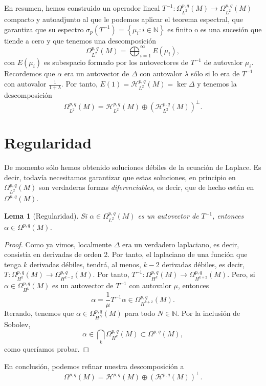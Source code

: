\documentclass[12pt,a4paper]{article}
\newtheorem{lema}[thm]{Lema}
\theoremstyle{definition} \newtheorem{defn}[thm]{Definición}
\theoremstyle{definition} \newtheorem{ejemplo}[thm]{Ejemplo}
\theoremstyle{definition} \newtheorem{ejercicio}[thm]{Ejercicio}
\theoremstyle{remark} \newtheorem*{obs}{Observación}
\newcommand{\NN}{\mathbb{N}}
\begin{document}
    En resumen, hemos construido un operador lineal $T^{-1}:\Omega^{p,q}_{L^2}(M)\rightarrow \Omega^{p,q}_{L^2}(M)$ compacto y autoadjunto al que le podemos aplicar el teorema espectral, que garantiza que su espectro $\sigma_p(T^{-1})=\left\{ \mu_i:i\in \NN \right\}$ es finito o es una sucesión que tiende a cero y que tenemos una descomposición
    \begin{equation*}
      \Omega^{p,q}_{L^2}(M)=\bigoplus_{i=1}^{\infty} E(\mu_i),
    \end{equation*}
    con $E(\mu_i)$ es subespacio formado por los autovectores de $T^{-1}$ de autovalor $\mu_i$. Recordemos que $\alpha$ era un autovector de $\Delta$ con autovalor $\lambda$ sólo si lo era de $T^{-1}$ con autovalor $\frac{1}{1+\lambda}$. Por tanto, $E(1)=\mathcal{H}^{p,q}_{L^2}(M)=\ker \Delta$ y tenemos la descomposición
    \begin{equation*}
      \Omega^{p,q}_{L^2}(M)=\mathcal{H}^{p,q}_{L^2}(M)\oplus(\mathcal{H}^{p,q}_{L^2}(M))^{\perp}.
    \end{equation*}

    \section{Regularidad}
    De momento sólo hemos obtenido soluciones débiles de la ecuación de Laplace. Es decir, todavía necesitamos garantizar que estas soluciones, en principio en $\Omega^{p,q}_{L^2}(M)$ son verdaderas formas \emph{diferenciables}, es decir, que de hecho están en $\Omega^{p,q}(M)$.

    \begin{lema}[Regularidad]
      Si $\alpha \in \Omega^{p,q}_{L^2}(M)$ es un autovector de $T^{-1}$, entonces $\alpha \in \Omega^{p,q}(M)$.
    \end{lema}
    \begin{proof}
      Como ya vimos, localmente $\Delta$ era un verdadero laplaciano, es decir, consistía en derivadas de orden 2. Por tanto, el laplaciano de una función que tenga $k$ derivadas débiles, tendrá, al menos, $k-2$ derivadas débiles, es decir, $T:\Omega^{p,q}_{H^k}(M) \rightarrow \Omega^{p,q}_{H^{k-2}}(M)$. Por tanto, $T^{-1}:\Omega^{p,q}_{H^{k}}(M) \rightarrow \Omega^{p,q}_{H^{k+2}}(M)$.     Pero, si $\alpha\in \Omega^{p,q}_{H^k}(M)$ es un autovector de $T^{-1}$ con autovalor $\mu$, entonces $$\alpha =\frac{1}{\mu} T^{-1}\alpha \in \Omega^{p,q}_{H^{k+2}}(M).$$ Iterando, tenemos que $\alpha \in \Omega^{p,q}_{H^{N}}(M)$ para todo $N\in \NN$. Por la inclusión de Sobolev,
      \begin{equation*}
	\alpha \in \bigcap_k \Omega^{p,q}_{H^k}(M) \subset \Omega^{p,q}(M),
      \end{equation*}
      como queríamos probar.
    \end{proof}
    En conclusión, podemos refinar nuestra descomposición a
    \begin{equation*}
      \Omega^{p,q}(M)=\mathcal{H}^{p,q}(M) \oplus (\mathcal{H}^{p,q}(M))^{\perp}.
    \end{equation*}
\end{document}
